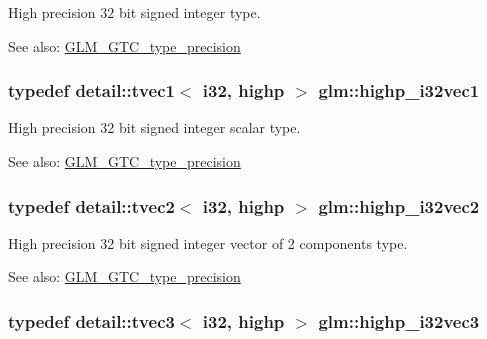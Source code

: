 High precision 32 bit signed integer type. \begin{Desc}
\item[See also:]\hyperlink{group__gtc__type__precision}{GLM\_\-GTC\_\-type\_\-precision} \end{Desc}
\hypertarget{group__gtc__type__precision_gdcd58130a48fa561e784a135a88c5d6e}{
\subsubsection[highp\_\-i32vec1]{\setlength{\rightskip}{0pt plus 5cm}typedef detail::tvec1$<$ i32, highp $>$ {\bf glm::highp\_\-i32vec1}}}
\label{group__gtc__type__precision_gdcd58130a48fa561e784a135a88c5d6e}


High precision 32 bit signed integer scalar type. \begin{Desc}
\item[See also:]\hyperlink{group__gtc__type__precision}{GLM\_\-GTC\_\-type\_\-precision} \end{Desc}
\hypertarget{group__gtc__type__precision_g6020d795076243085eb0d6826c849b4a}{
\subsubsection[highp\_\-i32vec2]{\setlength{\rightskip}{0pt plus 5cm}typedef detail::tvec2$<$ i32, highp $>$ {\bf glm::highp\_\-i32vec2}}}
\label{group__gtc__type__precision_g6020d795076243085eb0d6826c849b4a}


High precision 32 bit signed integer vector of 2 components type. \begin{Desc}
\item[See also:]\hyperlink{group__gtc__type__precision}{GLM\_\-GTC\_\-type\_\-precision} \end{Desc}
\hypertarget{group__gtc__type__precision_g95de80f73e676fb6b9976ff0d33bbc4b}{
\subsubsection[highp\_\-i32vec3]{\setlength{\rightskip}{0pt plus 5cm}typedef detail::tvec3$<$ i32, highp $>$ {\bf glm::highp\_\-i32vec3}}}
\label{group__gtc__type__precision_g95de80f73e676fb6b9976ff0d33bbc4b}


